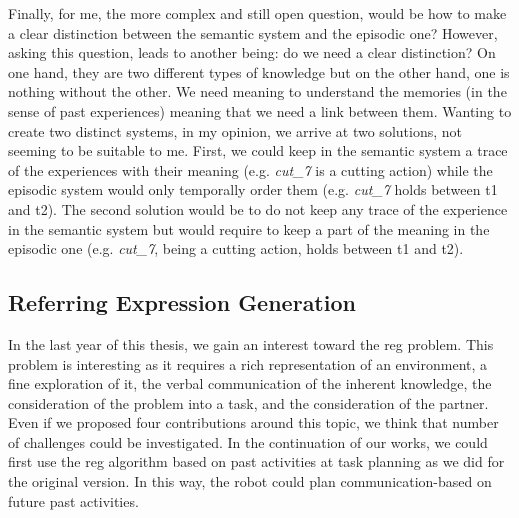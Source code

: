 Finally, for me, the more complex and still open question, would be how to make a clear distinction between the semantic system and the episodic one? However, asking this question, leads to another being: do we need a clear distinction? On one hand, they are two different types of knowledge but on the other hand, one is nothing without the other. We need meaning to understand the memories (in the sense of past experiences) meaning that we need a link between them. Wanting to create two distinct systems, in my opinion, we arrive at two solutions, not seeming to be suitable to me. First, we could keep in the semantic system a trace of the experiences with their meaning (e.g. \textit{cut\_7} is a cutting action) while the episodic system would only temporally order them (e.g. \textit{cut\_7} holds between t1 and t2). The second solution would be to do not keep any trace of the experience in the semantic system but would require to keep a part of the meaning in the episodic one (e.g. \textit{cut\_7}, being a cutting action, holds between t1 and t2).

\subsection*{Referring Expression Generation}

In the last year of this thesis, we gain an interest toward the \acrfull{reg} problem. This problem is interesting as it requires a rich representation of an environment, a fine exploration of it, the verbal communication of the inherent knowledge, the consideration of the problem into a task, and the consideration of the partner. Even if we proposed four contributions around this topic, we think that number of challenges could be investigated. In the continuation of our works, we could first use the \acrshort{reg} algorithm based on past activities at task planning as we did for the original version. In this way, the robot could plan communication-based on future past activities.

